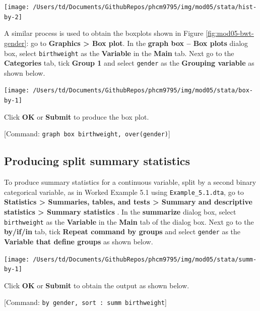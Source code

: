 \documentclass[
]{memoir}
\begin{document}
\texttt{[image: /Users/td/Documents/GithubRepos/phcm9795/img/mod05/stata/hist-by-2]}

A similar process is used to obtain the boxplots shown in Figure \ref{fig:mod05-bwt-gender}: go to \textbf{Graphics \textgreater{} Box plot}. In the \textbf{graph box -- Box plots} dialog box, select \texttt{birthweight} as the \textbf{Variable} in the \textbf{Main} tab. Next go to the \textbf{Categories} tab, tick \textbf{Group 1} and select \texttt{gender} as the \textbf{Grouping variable} as shown below.

\texttt{[image: /Users/td/Documents/GithubRepos/phcm9795/img/mod05/stata/box-by-1]}

Click \textbf{OK} or \textbf{Submit} to produce the box plot.

{[}Command: \texttt{graph\ box\ birthweight,\ over(gender)}{]}

\hypertarget{producing-split-summary-statistics}{%
\subsection{Producing split summary statistics}\label{producing-split-summary-statistics}}

To produce summary statistics for a continuous variable, split by a second binary categorical variable, as in Worked Example 5.1 using \texttt{Example\_5.1.dta}, go to \textbf{Statistics \textgreater{} Summaries, tables, and tests \textgreater{} Summary and descriptive statistics \textgreater{} Summary statistics} . In the \textbf{summarize} dialog box, select \texttt{birthweight} as the \textbf{Variable} in the \textbf{Main} tab of the dialog box. Next go to the \textbf{by/if/in} tab, tick \textbf{Repeat command by groups} and select \texttt{gender} as the \textbf{Variable that define groups} as shown below.

\texttt{[image: /Users/td/Documents/GithubRepos/phcm9795/img/mod05/stata/summ-by-1]}

Click \textbf{OK} or \textbf{Submit} to obtain the output as shown below.

{[}Command: \texttt{by\ gender,\ sort\ :\ summ\ birthweight}{]}
\end{document}
